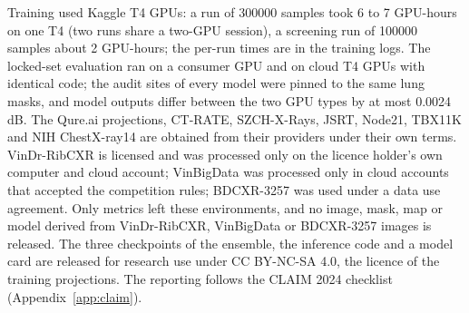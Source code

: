 Training used Kaggle T4 GPUs: a run of \num{300000} samples took 6 to 7 GPU-hours on one T4 (two runs share a two-GPU session), a screening run
of \num{100000} samples about 2 GPU-hours; the per-run times are in the training logs. The locked-set evaluation ran on a consumer GPU and on
cloud T4 GPUs with identical code; the audit sites of every model were pinned to the same lung masks, and model outputs differ between the two
GPU types by at most 0.0024\,dB.
The Qure.ai projections, CT-RATE, SZCH-X-Rays, JSRT, Node21, TBX11K and NIH ChestX-ray14 are obtained from their providers under their own terms.
VinDr-RibCXR is licensed and was processed only on the licence holder's own computer and cloud account; VinBigData was processed only in
cloud accounts that accepted the competition rules; BDCXR-3257 was used under a data use agreement. Only metrics left these environments, and no
image, mask, map or model derived from VinDr-RibCXR, VinBigData or BDCXR-3257 images is released.
The three checkpoints of the ensemble, the inference code and a model card are released for research use under CC BY-NC-SA 4.0, the licence of the
training projections. 
The reporting follows the CLAIM 2024 checklist \citep{tejani2024claim} (Appendix~\ref{app:claim}).
